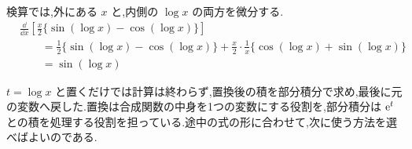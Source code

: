 検算では,外にある $x$ と,内側の $\log x$ の両方を微分する.
\[
\begin{aligned}
 &\frac{\dd}{\dd x}
 \left[\frac x2\{\sin(\log x)-\cos(\log x)\}\right]\\
 &\qquad=\frac12\{\sin(\log x)-\cos(\log x)\}
   +\frac x2\cdot\frac1x
     \{\cos(\log x)+\sin(\log x)\}\\
 &\qquad=\sin(\log x)
\end{aligned}
\]

$t=\log x$ と置くだけでは計算は終わらず,置換後の積を部分積分で求め,最後に元の変数へ戻した.置換は合成関数の中身を1つの変数にする役割を,部分積分は $\mathrm{e}^t$ との積を処理する役割を担っている.途中の式の形に合わせて,次に使う方法を選べばよいのである.
